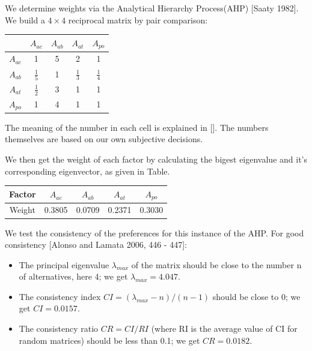 \documentclass[12pt,a4paper,titlepage]{article}
\begin{document}
We determine weights via the Analytical Hierarchy Process(AHP) [Saaty
1982]. We build a $4 \times 4$ reciprocal matrix by pair comparison:
\begin{center}
\begin{tabular}{|c|c|c|c|c|}
\hline
       &$A_{ac}$      &$A_{ab}$  &$A_{at}$    &$A_{po}$  \\ \hline
 $A_{ac}$ & 1           & 5 & 2            &1            \\ \hline
 $A_{ab}$ &$\frac{1}{5}$ & 1 &$\frac{1}{3}$ & $\frac{1}{4}$\\ \hline
 $A_{at}$ &$\frac{1}{2}$ & 3 & 1            &1            \\ \hline
 $A_{po}$ &1            & 4 & 1            &1            \\ \hline
\end{tabular}
\end{center}

The meaning of the number in each cell is explained in []. The numbers
themselves are based on our own subjective decisions.

We then get the weight of each factor by calculating the bigest
eigenvalue and it's corresponding eigenvector, as given in Table.

\begin{center}
\begin{tabular}{c|cccc}
  Factor  &$A_{ac}$    &$A_{ab}$   &$A_{at}$    &$A_{po}$\\ \hline
  Weight  &0.3805  &0.0709  &0.2371  &0.3030\\
\end{tabular}
\end{center}

We test the consistency of the preferences for this instance of the
AHP. For good consistency [Alonso and Lamata 2006, 446 - 447]:

\begin{itemize}
\item The principal eigenvalue $\lambda_{max}$ of the matrix should be
  close to the number n of alternatives, here 4; we get $\lambda_{max} = 4.047$.
\item The consistency index $CI = (\lambda_{max}-n)/(n-1)$ should be close to 0; we get $CI = 0.0157$.
\item The consistency ratio $CR = CI/RI$ (where RI is the average
  value of CI for random matrices) should be less than 0.1; we get $CR
  = 0.0182$.
\end{itemize}
\end{document}
